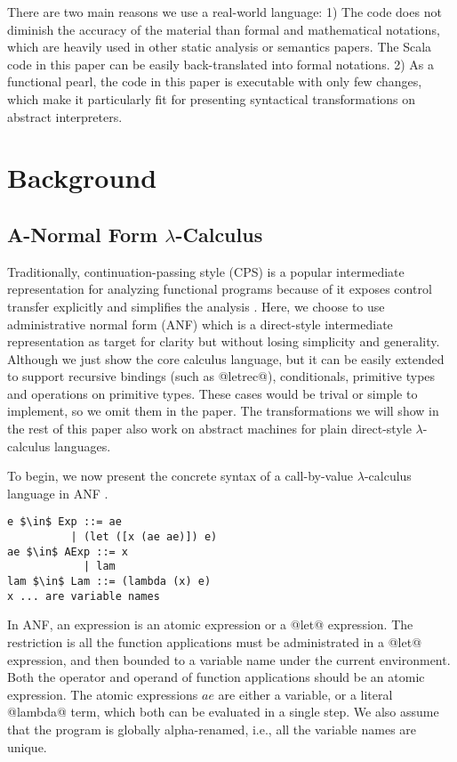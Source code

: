 \documentclass[acmsmall,review,anonymous]{acmart}\settopmatter{printfolios=true,printccs=false,printacmref=false}
\begin{document}
There are two main reasons we use a real-world language:
1) The code does not diminish the accuracy of the material
than formal and mathematical notations, 
which are heavily used in other static analysis or semantics papers.
The Scala code in this paper can be easily back-translated into formal notations.
2) As a functional pearl, the code in this paper is executable with only few changes, 
which make it particularly fit for presenting syntactical transformations on abstract
interpreters.

\section{Background} \label{background}

\subsection{A-Normal Form $\lambda$-Calculus} \label{anfsyntax}

Traditionally, continuation-passing style (CPS) is a popular intermediate representation
for analyzing functional programs because of it exposes control transfer explicitly
and simplifies the analysis \cite{Shivers:1991:SSC:115865.115884, Shivers:1988:CFA:53990.54007}.
Here, we choose to use administrative normal form (ANF) which is a direct-style intermediate representation 
as target for clarity but without losing simplicity and generality.
Although we just show the core calculus language, but it can be easily extended
to support recursive bindings (such as @letrec@), conditionals, primitive types and 
operations on primitive types. These cases would be trival or simple to implement, 
so we omit them in the paper.
The transformations we will show in the rest of this paper
also work on abstract machines for plain direct-style $\lambda$-calculus languages.

To begin, we now present the concrete syntax of a call-by-value $\lambda$-calculus language 
in ANF \cite{flanagan1993essence}.

\begin{lstlisting}
e $\in$ Exp ::= ae
          | (let ([x (ae ae)]) e)
ae $\in$ AExp ::= x            
            | lam
lam $\in$ Lam ::= (lambda (x) e)
x ... are variable names
\end{lstlisting}

In ANF, an expression is an atomic expression or a @let@ expression.
The restriction is all the function applications must be administrated in a @let@ expression,
and then bounded to a variable name under the current environment.
Both the operator and operand of function applications should be an atomic expression.
The atomic expressions $ae$ are either a variable, or a literal @lambda@ term, which
both can be evaluated in a single step.
We also assume that the program is globally alpha-renamed, i.e., all the
variable names are unique.
\end{document}

